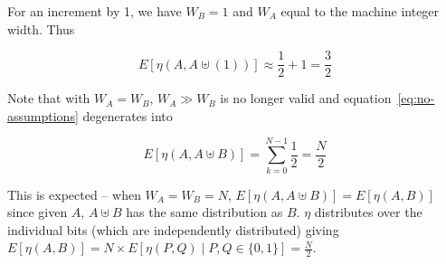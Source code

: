 For an increment by 1, we have $W_B = 1$ and $W_A$ equal to the
machine integer width.  Thus

\begin{equation}
  \label{eq:average-flips}
  E[\eta(A, A \uplus (1))] \approx \frac{1}{2} + 1 = \frac{3}{2}
\end{equation}

Note that with $W_A = W_B$, $W_A \gg W_B$ is no longer valid and
equation~\ref{eq:no-assumptions} degenerates into

\begin{equation}
  E[\eta(A, A \uplus B)] = \displaystyle\sum\limits_{k=0}^{N - 1} \frac{1}{2} =
  \frac{N}{2}
\end{equation}

This is expected -- when $W_A = W_B = N$, $E[\eta(A, A \uplus B)] =
E[\eta(A, B)]$ since given $A$, $A \uplus B$ has the same distribution as
$B$.  $\eta$ distributes over the individual bits (which are
independently distributed) giving $E[\eta(A, B)] = N \times E[\eta(P,
  Q) \mid P, Q \in \{0, 1\}] = \frac{N}{2}$.
 

